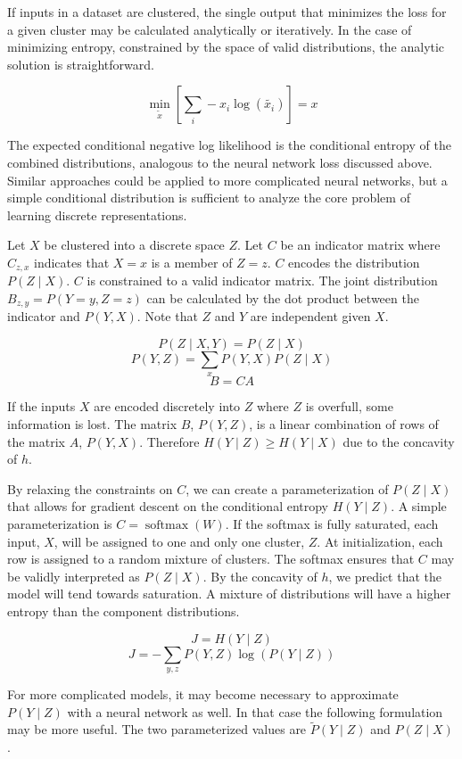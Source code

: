 \documentclass[11pt,letterpaper]{article}
\begin{document}
If inputs in a dataset are clustered, the single output that minimizes the loss for a given cluster may be calculated analytically or iteratively. In the case of minimizing entropy, constrained by the space of valid distributions, the analytic solution is straightforward.

$$\min_{\tilde{x}}[\sum_i-x_i \log(\tilde{x_i})] = x$$

The expected conditional negative log likelihood is the conditional entropy of the combined distributions, analogous to the neural network loss discussed above. Similar approaches could be applied to more complicated neural networks, but a simple conditional distribution is sufficient to analyze the core problem of learning discrete representations.

Let $X$ be clustered into a discrete space $Z$. Let $C$ be an indicator matrix where $C_{z,x}$ indicates that $X=x$ is a member of $Z=z$. $C$ encodes the distribution $P(Z \mid X)$. $C$ is constrained to a valid indicator matrix. The joint distribution $B_{z,y}=P(Y=y,Z=z)$ can be calculated by the dot product between the indicator and $P(Y,X)$. Note that $Z$ and $Y$ are independent given $X$.

$$P(Z \mid X,Y) = P(Z \mid X)$$
$$P(Y,Z) = \sum_x P(Y,X) P(Z \mid X)$$
$$B = C A $$ 

If the inputs $X$ are encoded discretely into $Z$ where $Z$ is overfull, some information is lost.  The matrix $B$, $P(Y,Z)$, is a linear combination of rows of the matrix $A$, $P(Y,X)$. Therefore $H(Y \mid Z) \ge H(Y \mid X)$ due to the concavity of $h$. 

By relaxing the constraints on $C$, we can create a parameterization of $P(Z \mid X)$ that allows for gradient descent on the conditional entropy $H(Y\mid Z)$. A simple parameterization
is $C=\operatorname{softmax}(W)$. If the softmax is fully saturated, each input, $X$, will be assigned to one and only one cluster, $Z$. At initialization, each row is assigned to a random mixture of clusters. The softmax ensures that $C$ may be validly interpreted as $P(Z \mid X)$. By the concavity of $h$, we predict that the model will tend towards saturation. A mixture of distributions will have a higher entropy than the component distributions.

$$ J = H(Y \mid Z) $$
$$ J = - \sum_{y,z} P(Y, Z) \log( P(Y \mid Z)) $$

For more complicated models, it may become necessary to approximate $P(Y \mid Z)$ with a neural network as well. In that case the following formulation may be more useful. The two parameterized values are $\tilde{P}(Y \mid Z)$ and $P(Z \mid X)$.
\end{document}

